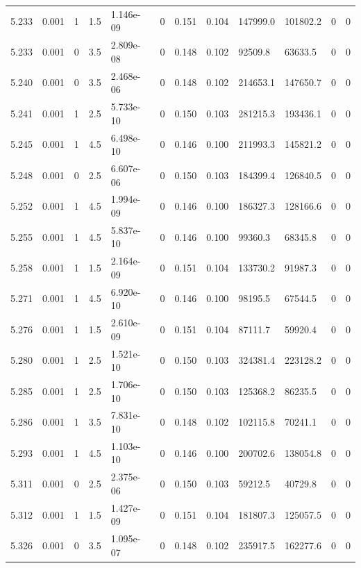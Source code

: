 \documentclass[preview]{standalone}
\begin{document}
{{{{{{{{{{{{\begin{tabular}{L{1.2cm}C{1.2cm} C{0.3cm}C{0.5cm} C{1.4cm}C{1.4cm} C{1.4cm}C{1.4cm} C{1.6cm}C{1.6cm} C{1.6cm}C{1.6cm}}
  5.233  &  0.001  & 1     & 1.5 &  1.146e-09  & 0  &  0.151&   0.104& 147999.0 & 101802.2   &  0 & 0  \\ 
  5.233  &  0.001  & 0     & 3.5 &  2.809e-08  & 0  &  0.148&   0.102& 92509.8 & 63633.5   &  0 & 0  \\ 
  5.240  &  0.001  & 0     & 3.5 &  2.468e-06  & 0  &  0.148&   0.102& 214653.1 & 147650.7   &  0 & 0  \\ 
  5.241  &  0.001  & 1     & 2.5 &  5.733e-10  & 0  &  0.150&   0.103& 281215.3 & 193436.1   &  0 & 0  \\ 
  5.245  &  0.001  & 1     & 4.5 &  6.498e-10  & 0  &  0.146&   0.100& 211993.3 & 145821.2   &  0 & 0  \\ 
  5.248  &  0.001  & 0     & 2.5 &  6.607e-06  & 0  &  0.150&   0.103& 184399.4 & 126840.5   &  0 & 0  \\ 
  5.252  &  0.001  & 1     & 4.5 &  1.994e-09  & 0  &  0.146&   0.100& 186327.3 & 128166.6   &  0 & 0  \\ 
  5.255  &  0.001  & 1     & 4.5 &  5.837e-10  & 0  &  0.146&   0.100& 99360.3 & 68345.8   &  0 & 0  \\ 
  5.258  &  0.001  & 1     & 1.5 &  2.164e-09  & 0  &  0.151&   0.104& 133730.2 & 91987.3   &  0 & 0  \\ 
  5.271  &  0.001  & 1     & 4.5 &  6.920e-10  & 0  &  0.146&   0.100& 98195.5 & 67544.5   &  0 & 0  \\ 
  5.276  &  0.001  & 1     & 1.5 &  2.610e-09  & 0  &  0.151&   0.104& 87111.7 & 59920.4   &  0 & 0  \\ 
  5.280  &  0.001  & 1     & 2.5 &  1.521e-10  & 0  &  0.150&   0.103& 324381.4 & 223128.2   &  0 & 0  \\ 
  5.285  &  0.001  & 1     & 2.5 &  1.706e-10  & 0  &  0.150&   0.103& 125368.2 & 86235.5   &  0 & 0  \\ 
  5.286  &  0.001  & 1     & 3.5 &  7.831e-10  & 0  &  0.148&   0.102& 102115.8 & 70241.1   &  0 & 0  \\ 
  5.293  &  0.001  & 1     & 4.5 &  1.103e-10  & 0  &  0.146&   0.100& 200702.6 & 138054.8   &  0 & 0  \\ 
  5.311  &  0.001  & 0     & 2.5 &  2.375e-06  & 0  &  0.150&   0.103& 59212.5 & 40729.8   &  0 & 0  \\ 
  5.312  &  0.001  & 1     & 1.5 &  1.427e-09  & 0  &  0.151&   0.104& 181807.3 & 125057.5   &  0 & 0  \\ 
  5.326  &  0.001  & 0     & 3.5 &  1.095e-07  & 0  &  0.148&   0.102& 235917.5 & 162277.6   &  0 & 0  \\ 

\end{tabular}}}}}}}}}}}}}
\end{document}
